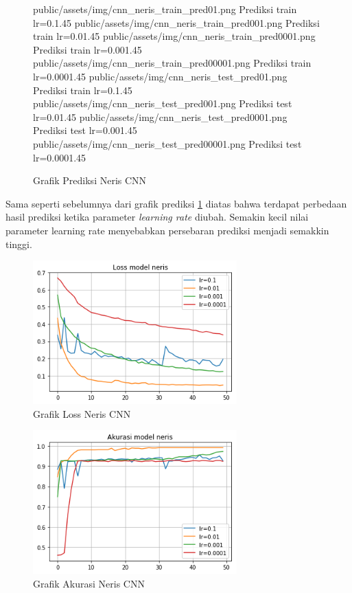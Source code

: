 \documentclass[./skripsi.tex]{subfiles}
\begin{document}
\begin{figure}%
\centering
\buatsubgrafik 
{public/assets/img/cnn_neris_train_pred01.png}
{Prediksi train lr=0.1}{.45}{}
\buatsubgrafik 
{public/assets/img/cnn_neris_train_pred001.png}
{Prediksi train lr=0.01}{.45}{}
\buatsubgrafik 
{public/assets/img/cnn_neris_train_pred0001.png}
{Prediksi train lr=0.001}{.45}{}
\buatsubgrafik 
{public/assets/img/cnn_neris_train_pred00001.png}
{Prediksi train lr=0.0001}{.45}{}
\buatsubgrafik 
{public/assets/img/cnn_neris_test_pred01.png}
{Prediksi train lr=0.1}{.45}{}
\buatsubgrafik 
{public/assets/img/cnn_neris_test_pred001.png}
{Prediksi test lr=0.01}{.45}{}
\buatsubgrafik 
{public/assets/img/cnn_neris_test_pred0001.png}
{Prediksi test lr=0.001}{.45}{}
\buatsubgrafik 
{public/assets/img/cnn_neris_test_pred00001.png}
{Prediksi test lr=0.0001}{.45}{}
\caption{Grafik Prediksi Neris CNN}
\label{fig:cnn_neris_pred}
\end{figure}
\par Sama seperti sebelumnya dari grafik prediksi \ref{fig:cnn_neris_pred} diatas bahwa terdapat perbedaan hasil prediksi ketika parameter \textit{learning rate} diubah. Semakin kecil nilai parameter learning rate menyebabkan persebaran prediksi menjadi semakkin tinggi.
\begin{figure}%
	\centering
	\includegraphics[width=0.7\textwidth]{public/assets/img/cnn_neris_loss.png}
	\caption{Grafik Loss Neris CNN}
	\label{fig:cnn_neris_loss}
\end{figure}
\begin{figure}%
	\centering
	\includegraphics[width=0.7\textwidth]{public/assets/img/cnn_neris_acc.png}
	\caption{Grafik Akurasi Neris CNN}
	\label{fig:cnn_neris_acc}
\end{figure}
\end{document}
